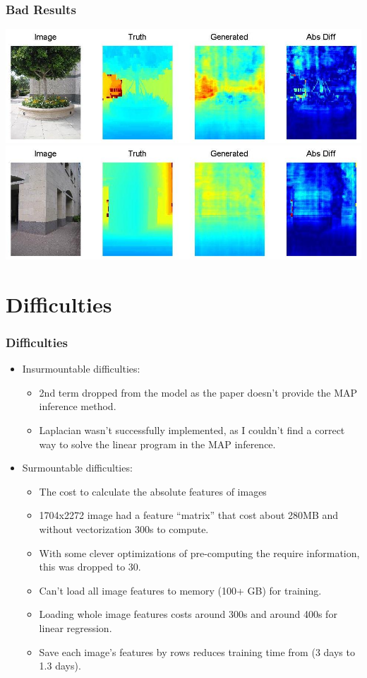 \documentclass[handout]{beamer}
\newcommand{\vitem}{\vfill\item}
\begin{document}
\begin{frame}[t]\frametitle{Bad Results}
    \includegraphics[width=\linewidth]{bad3.jpg} \\
    \vfill\includegraphics[width=\linewidth]{bad4.jpg}
\end{frame}

\section{Difficulties}
\begin{frame}[t]\frametitle{Difficulties}
    \begin{itemize}
        \item Insurmountable difficulties:
        \begin{itemize}
            \vitem 2nd term dropped from the model as the paper doesn't provide the MAP inference method.
            \vitem Laplacian wasn't successfully implemented, as I couldn't find a correct way to solve the linear program in the MAP inference.
        \end{itemize}
        \item Surmountable difficulties:
        \begin{itemize}
            \vitem The cost to calculate the absolute features of images
            \vitem 1704x2272 image had a feature ``matrix'' that cost about 280MB and without vectorization 300s to compute.
            \vitem With some clever optimizations of pre-computing the require information, this was dropped to 30.
            \vitem Can't load all image features to memory (100+ GB) for training.
            \vitem Loading whole image features costs around 300s and around 400s for linear regression.
            \vitem Save each image's features by rows reduces training time from (3 days to 1.3 days).
        \end{itemize}
    \end{itemize}
\end{frame}
\end{document}
